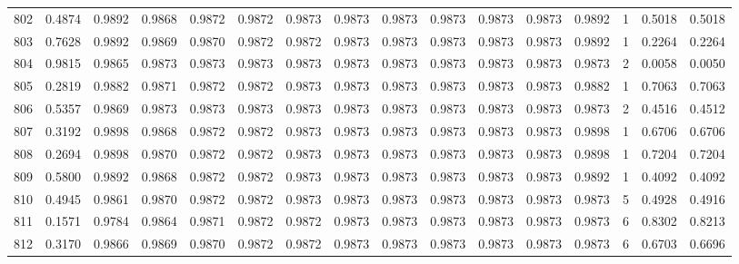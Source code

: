 \begin{tabular}{lrrrrrrrrrrrrrrr}
802 &      0.4874 &  0.9892 &  0.9868 &  0.9872 &  0.9872 &  0.9873 &  0.9873 &  0.9873 &  0.9873 &  0.9873 &   0.9873 &     0.9892 &      1 &                    0.5018 &                     0.5018 \\
803 &      0.7628 &  0.9892 &  0.9869 &  0.9870 &  0.9872 &  0.9872 &  0.9873 &  0.9873 &  0.9873 &  0.9873 &   0.9873 &     0.9892 &      1 &                    0.2264 &                     0.2264 \\
804 &      0.9815 &  0.9865 &  0.9873 &  0.9873 &  0.9873 &  0.9873 &  0.9873 &  0.9873 &  0.9873 &  0.9873 &   0.9873 &     0.9873 &      2 &                    0.0058 &                     0.0050 \\
805 &      0.2819 &  0.9882 &  0.9871 &  0.9872 &  0.9872 &  0.9873 &  0.9873 &  0.9873 &  0.9873 &  0.9873 &   0.9873 &     0.9882 &      1 &                    0.7063 &                     0.7063 \\
806 &      0.5357 &  0.9869 &  0.9873 &  0.9873 &  0.9873 &  0.9873 &  0.9873 &  0.9873 &  0.9873 &  0.9873 &   0.9873 &     0.9873 &      2 &                    0.4516 &                     0.4512 \\
807 &      0.3192 &  0.9898 &  0.9868 &  0.9872 &  0.9872 &  0.9873 &  0.9873 &  0.9873 &  0.9873 &  0.9873 &   0.9873 &     0.9898 &      1 &                    0.6706 &                     0.6706 \\
808 &      0.2694 &  0.9898 &  0.9870 &  0.9872 &  0.9872 &  0.9873 &  0.9873 &  0.9873 &  0.9873 &  0.9873 &   0.9873 &     0.9898 &      1 &                    0.7204 &                     0.7204 \\
809 &      0.5800 &  0.9892 &  0.9868 &  0.9872 &  0.9872 &  0.9873 &  0.9873 &  0.9873 &  0.9873 &  0.9873 &   0.9873 &     0.9892 &      1 &                    0.4092 &                     0.4092 \\
810 &      0.4945 &  0.9861 &  0.9870 &  0.9872 &  0.9872 &  0.9873 &  0.9873 &  0.9873 &  0.9873 &  0.9873 &   0.9873 &     0.9873 &      5 &                    0.4928 &                     0.4916 \\
811 &      0.1571 &  0.9784 &  0.9864 &  0.9871 &  0.9872 &  0.9872 &  0.9873 &  0.9873 &  0.9873 &  0.9873 &   0.9873 &     0.9873 &      6 &                    0.8302 &                     0.8213 \\
812 &      0.3170 &  0.9866 &  0.9869 &  0.9870 &  0.9872 &  0.9872 &  0.9873 &  0.9873 &  0.9873 &  0.9873 &   0.9873 &     0.9873 &      6 &                    0.6703 &                     0.6696 \\

\end{tabular}

